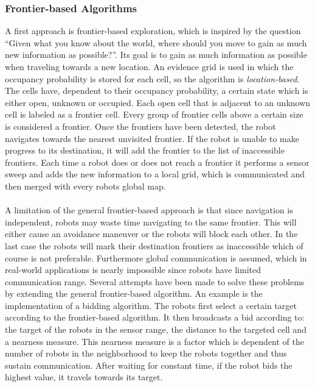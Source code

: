   \subsubsection{Frontier-based Algorithms}
  A first approach is frontier-based exploration, which is inspired by the question ``Given what you know about the world, where should you move to gain as much new information as possible?''.
  Its goal is to gain as much information as possible when traveling towards a new location.
  An evidence grid is used in which the occupancy probability is stored for each cell, so the algorithm is \emph{location-based}.
  The cells have, dependent to their occupancy probability, a certain state which is either open, unknown or occupied.
  Each open cell that is adjacent to an unknown cell is labeled as a frontier cell.
  Every group of frontier cells above a certain size is considered a frontier.
  Once the frontiers have been detected, the robot navigates towards the nearest unvisited frontier.
  If the robot is unable to make progress to its destination, it will add the frontier to the list of inaccessible frontiers.
  Each time a robot does or does not reach a frontier it performs a sensor sweep and adds the new information to a local grid, which is communicated and then merged with every robots global map. \cite{yamauchi1998frontier}\\
  \\
  A limitation of the general frontier-based approach is that since navigation is independent, robots may waste time navigating to the same frontier.
  This will either cause an avoidance maneuver or the robots will block each other.
  In the last case the robots will mark their destination frontiers as inaccessible which of course is not preferable.
  Furthermore global communication is assumed, which in real-world applications is nearly impossible since robots have limited communication range.
  Several attempts have been made to solve these problems by extending the general frontier-based algorithm.
  An example is the implementation of a bidding algorithm.
  The robots first select a certain target according to the frontier-based algorithm.
  It then broadcasts a bid according to: the target of the robots in the sensor range, the distance to the targeted cell and a nearness measure.
  This nearness measure is a factor which is dependent of the number of robots in the neighborhood to keep the robots together and thus sustain communication.
  After waiting for constant time, if the robot bids the highest value, it travels towards its target.
